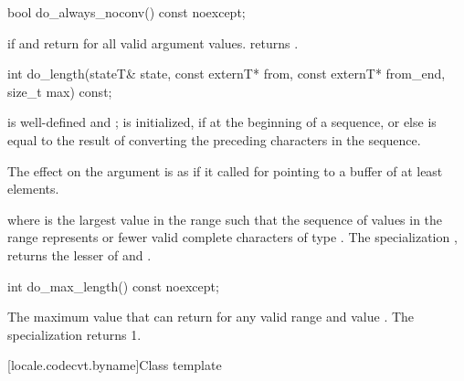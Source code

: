 %
\begin{itemdecl}
bool do_always_noconv() const noexcept;
\end{itemdecl}

\begin{itemdescr}
\pnum
\returns
{}
if
and
return
for all valid argument values.
returns
.
\end{itemdescr}

%
\begin{itemdecl}
int do_length(stateT& state, const externT* from, const externT* from_end, size_t max) const;
\end{itemdecl}

\begin{itemdescr}
\pnum
\expects
{} is well-defined and ;
 is initialized, if at the beginning of a sequence,
or else is equal to the result of converting the preceding characters in the sequence.

\pnum
\effects
The effect on the  argument is as if it called
for  pointing to a buffer of at least  elements.

\pnum
\returns
{}
where
is the largest value in the range
such that the sequence of values in the range
represents
or fewer valid complete characters of type
.
The specialization
,
returns the lesser of
and
.
\end{itemdescr}

%
\begin{itemdecl}
int do_max_length() const noexcept;
\end{itemdecl}

\begin{itemdescr}
\pnum
\returns
The maximum value that
can return for any valid range
and
value
.
The specialization
returns 1.
\end{itemdescr}

[locale.codecvt.byname]{Class template }

